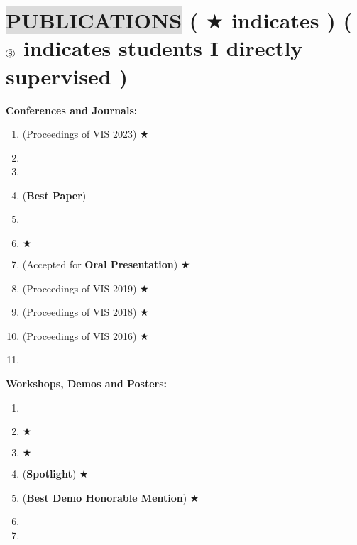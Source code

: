 \section*{
    \colorbox{gainsboro}{PUBLICATIONS}  {\small \normalfont ( \footnotesize $\bigstar$ \small indicates  ) ( $\circledS$ indicates students I directly supervised )}
}
    

\textbf{Conferences and Journals:}
\vspace{-3mm}
\begin{enumerate}[leftmargin=5mm]
    \item {} (Proceedings of VIS 2023) \footnotesize $\bigstar$ \small
    \item {}
    \item {}
    \item {} (\textbf{Best Paper})
    \item {}
    \item {} \footnotesize $\bigstar$ \small
    \item {} (Accepted for \textbf{Oral Presentation}) \footnotesize $\bigstar$ \small
    \item {} (Proceedings of VIS 2019) \footnotesize $\bigstar$ \small
    \item {} (Proceedings of VIS 2018) \footnotesize $\bigstar$ \small
    \item {} (Proceedings of VIS 2016) \footnotesize $\bigstar$ \small
    \item {}
\end{enumerate}

\textbf{Workshops, Demos and Posters:}
\vspace{-3mm}
\begin{enumerate}[leftmargin=5mm]
    \item {}
    \item {}
    \footnotesize $\bigstar$ \small
    \item {}
    \footnotesize $\bigstar$ \small
    \item {}
    (\textbf{Spotlight})
    \footnotesize $\bigstar$ \small
    \item {}
    (\textbf{Best Demo Honorable Mention})
    \footnotesize $\bigstar$ \small
   \item {}
   \item {} 
\end{enumerate}
